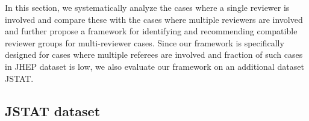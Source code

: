 % 
% 



In this section, we systematically analyze the cases where a single reviewer is involved and compare these with the cases where multiple reviewers are involved and further 
propose a framework for identifying and recommending compatible reviewer groups for multi-reviewer cases. Since our framework is specifically designed for cases where 
multiple referees are involved and fraction of such cases in JHEP dataset is low, we also evaluate our framework on an additional dataset JSTAT.

\subsection{JSTAT dataset}

